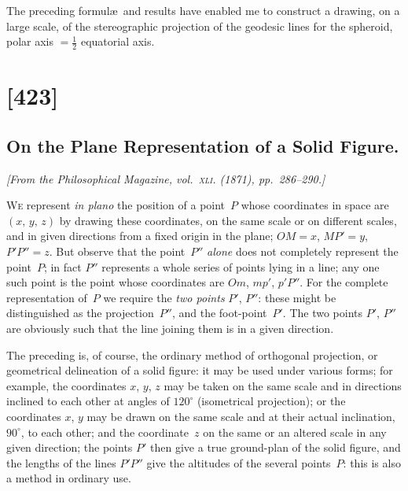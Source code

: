 \documentclass[11pt,a4paper]{article}
\theoremstyle{plain}
\theoremstyle{definition}
\begin{document}
The preceding formul\ae\ and results have enabled me to construct a drawing, on
a large scale, of the stereographic projection of the geodesic lines for the spheroid,
polar axis $= \tfrac{1}{2}$ equatorial axis.

\clearpage

\section{[423]}
\subsection{On the Plane Representation of a Solid Figure.}

\begin{center}
\textit{[From the Philosophical Magazine, vol.~\textsc{xli}. (1871), pp.~286--290.]}
\end{center}

\textsc{We} represent \textit{in plano} the position of a point~$P$ whose coordinates in space are
$(x,\,y,\,z)$ by drawing these coordinates, on the same scale or on different scales, and
in given directions from a fixed origin in the plane; $OM = x$, $MP' = y$, $P'P'' = z$.  But
observe that the point~$P''$ \textit{alone} does not completely represent the point~$P$; in fact
$P''$ represents a whole series of points lying in a line; any one such point is the
point whose coordinates are $Om$, $mp'$, $p'P''$.  For the complete representation of~$P$ we
require the \textit{two points} $P'$, $P''$: these might be distinguished as the projection~$P''$, and
the foot-point~$P'$.  The two points $P'$, $P''$ are obviously such that the line joining them
is in a given direction.

The preceding is, of course, the ordinary method of orthogonal projection, or
geometrical delineation of a solid figure: it may be used under various forms; for
example, the coordinates $x$, $y$, $z$ may be taken on the same scale and in directions
inclined to each other at angles of  $120^\circ$ (isometrical projection); or the coordinates $x$, $y$
may be drawn on the same scale and at their actual inclination,  $90^\circ$, to each other;
and the coordinate~$z$ on the same or an altered scale in any given direction; the
points $P'$ then give a true ground-plan of the solid figure, and the lengths of the
lines $P'P''$ give the altitudes of the several points~$P$: this is also a method in
ordinary use.
\end{document}
